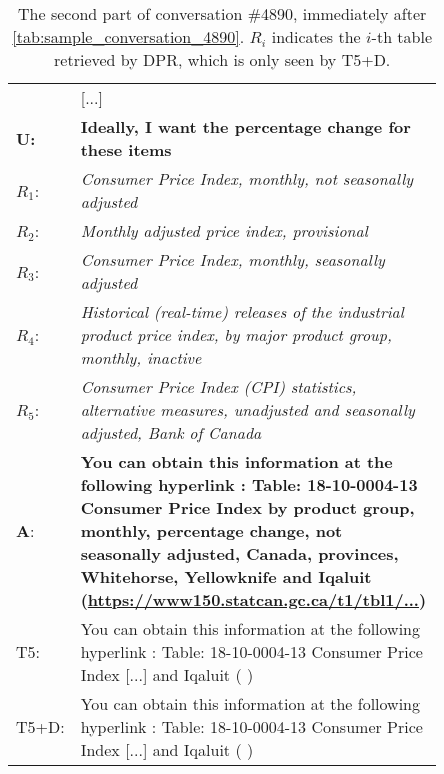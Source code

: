 \documentclass[11pt]{article}
\begin{document}
\begin{table*}[h]
    \small
    \centering
    \begin{tabular}{l p{0.85\linewidth}}
        \toprule
         & [...]
        \\
        \textbf{U:} & \textbf{Ideally, I want the percentage change for these items}
        \\
        $R_1$: & \textit{Consumer Price Index, monthly, not seasonally adjusted }
        \\
        $R_2$: & \textit{Monthly adjusted price index, provisional}
        \\
        $R_3$: & \textit{Consumer Price Index, monthly, seasonally adjusted}
        \\
        $R_4$: & \textit{Historical (real-time) releases of the industrial product price index, by major product group, monthly, inactive}
        \\
        $R_5$: & \textit{Consumer Price Index (CPI) statistics, alternative measures, unadjusted and seasonally adjusted, Bank of Canada}
        \\
        \midrule
        \textbf{A}: & \textbf{You can obtain this information at the following hyperlink : Table: 18-10-0004-13 Consumer Price Index by product group, monthly, percentage change, not seasonally adjusted, Canada, provinces, Whitehorse, Yellowknife and Iqaluit (\href{https://www150.statcan.gc.ca/t1/tbl1/en/tv.action?pid=1810000413}{https://www150.statcan.gc.ca/t1/tbl1/...})}
        \\
        T5: & You can obtain this information at the following hyperlink : Table: 18-10-0004-13 Consumer Price Index [...] and Iqaluit ( )
        \\
        T5+D: & You can obtain this information at the following hyperlink : Table: 18-10-0004-13 Consumer Price Index [...] and Iqaluit ( )
        \\
        \bottomrule
    \end{tabular}
    \caption{The second part of conversation \#4890, immediately after \autoref{tab:sample_conversation_4890}. $R_i$ indicates the $i$-th table retrieved by DPR, which is only seen by T5+D.}
    \label{tab:sample_conversation_4890_part_2}
\end{table*}
\end{document}
